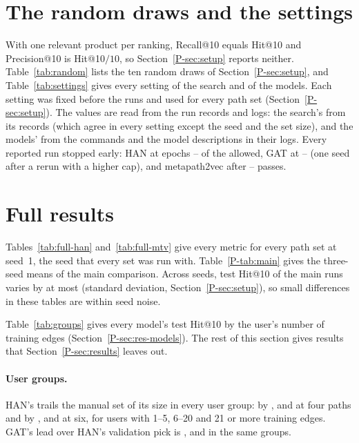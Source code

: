 \section{The random draws and the settings}
\label{app:settings}

With one relevant product per ranking, Recall@10 equals Hit@10 and Precision@10 is Hit@10$/10$,
so Section~\ref*{P-sec:setup} reports neither. Table~\ref{tab:random} lists the ten random draws of
Section~\ref*{P-sec:setup}, and Table~\ref{tab:settings} gives every setting of the search and of the
models. Each setting was fixed before the runs and used for every path set
(Section~\ref*{P-sec:setup}). The values are read from the run records and logs: the search's from its
 records (which agree in every setting except the seed and the set size), and
the models' from the commands and the model descriptions in their logs. Every reported run stopped
early: HAN at epochs -- of the  allowed, GAT
at -- (one seed after a rerun with a higher cap), and
metapath2vec after -- passes.




\section{Full results}
\label{app:full}

Tables~\ref{tab:full-han} and~\ref{tab:full-mtv} give every metric for every path set at seed~1,
the seed that every set was run with. Table~\ref*{P-tab:main} gives the three-seed means of the main
comparison. Across seeds, test Hit@10 of the main runs varies by at most 
(standard deviation, Section~\ref*{P-sec:setup}), so small differences in these tables are within
seed noise.

Table~\ref{tab:groups} gives every model's test Hit@10 by the user's number of training edges
(Section~\ref*{P-sec:res-models}). The rest of this section gives results that
Section~\ref*{P-sec:results} leaves out.

\paragraph{User groups.} HAN's  trails the manual set of its size in every user group: by
,  and  at four paths and by
,  and  at six, for users with
1--5, 6--20 and 21 or more training edges. GAT's lead over HAN's validation pick is
,  and  in the same groups.

